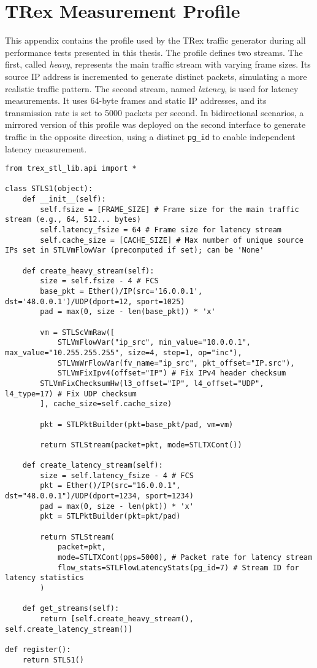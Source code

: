 \chapter{TRex Measurement Profile}
\label{appendix:trex-profile}

This appendix contains the profile used by the TRex traffic generator during all performance tests presented in this thesis.  
The profile defines two streams. The first, called \textit{heavy}, represents the main traffic stream with varying frame sizes.  
Its source IP address is incremented to generate distinct packets, simulating a more realistic traffic pattern.  
The second stream, named \textit{latency}, is used for latency measurements. It uses 64-byte frames and static IP addresses, and its transmission rate is set to 5000 packets per second.  
In bidirectional scenarios, a mirrored version of this profile was deployed on the second interface to generate traffic in the opposite direction, using a distinct \texttt{pg\_id} to enable independent latency measurement.

\begin{lstlisting}[caption={TRex Measurement Profile Example}]
from trex_stl_lib.api import *

class STLS1(object):
    def __init__(self):
        self.fsize = [FRAME_SIZE] # Frame size for the main traffic stream (e.g., 64, 512... bytes)
        self.latency_fsize = 64 # Frame size for latency stream
        self.cache_size = [CACHE_SIZE] # Max number of unique source IPs set in STLVmFlowVar (precomputed if set); can be 'None'

    def create_heavy_stream(self):
        size = self.fsize - 4 # FCS
        base_pkt = Ether()/IP(src='16.0.0.1', dst='48.0.0.1')/UDP(dport=12, sport=1025)
        pad = max(0, size - len(base_pkt)) * 'x'

        vm = STLScVmRaw([
            STLVmFlowVar("ip_src", min_value="10.0.0.1", max_value="10.255.255.255", size=4, step=1, op="inc"),
            STLVmWrFlowVar(fv_name="ip_src", pkt_offset="IP.src"),
            STLVmFixIpv4(offset="IP") # Fix IPv4 header checksum
 	    STLVmFixChecksumHw(l3_offset="IP", l4_offset="UDP", l4_type=17) # Fix UDP checksum
        ], cache_size=self.cache_size)

        pkt = STLPktBuilder(pkt=base_pkt/pad, vm=vm)

        return STLStream(packet=pkt, mode=STLTXCont())

    def create_latency_stream(self):
        size = self.latency_fsize - 4 # FCS
        pkt = Ether()/IP(src="16.0.0.1", dst="48.0.0.1")/UDP(dport=1234, sport=1234)
        pad = max(0, size - len(pkt)) * 'x'
        pkt = STLPktBuilder(pkt=pkt/pad)

        return STLStream(
            packet=pkt,
            mode=STLTXCont(pps=5000), # Packet rate for latency stream
            flow_stats=STLFlowLatencyStats(pg_id=7) # Stream ID for latency statistics
        )

    def get_streams(self):
        return [self.create_heavy_stream(), self.create_latency_stream()]

def register():
    return STLS1()

\end{lstlisting}

